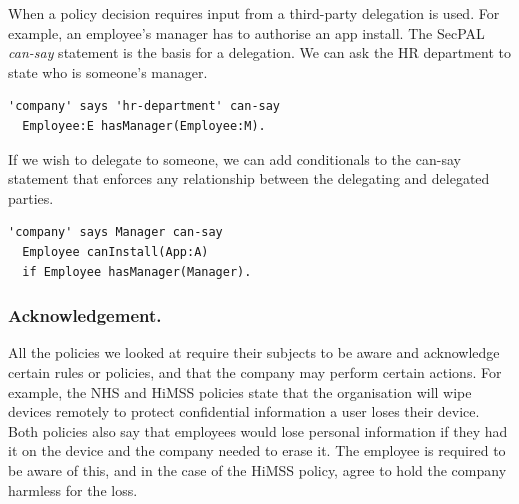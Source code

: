 \documentclass{llncs}
\begin{document}
When a policy decision requires input from a third-party delegation is used.
For example, an employee's manager has to authorise an app install.
The SecPAL \emph{can-say} statement is the basis for a delegation. 
We can ask the HR department to state who is someone's manager.
\begin{lstlisting}
'company' says 'hr-department' can-say 
  Employee:E hasManager(Employee:M).
\end{lstlisting}
If we wish to delegate to someone, we can add conditionals to the can-say statement that enforces any relationship between the delegating and delegated parties.
\begin{lstlisting}
'company' says Manager can-say 
  Employee canInstall(App:A)
  if Employee hasManager(Manager).
\end{lstlisting}

\subsubsection{Acknowledgement.}

All the policies we looked at require their subjects to be aware and acknowledge certain rules or policies, 
  and that the company may perform certain actions.
For example, the NHS and \ac{HiMSS} policies state that the organisation will wipe devices remotely to protect confidential information a user loses their device.
Both policies also say that employees would lose personal information if they had it on the device and the company needed to erase it.
The employee is required to be aware of this, and in the case of the \ac{HiMSS} policy, agree to hold the company harmless for the loss.
\end{document}
